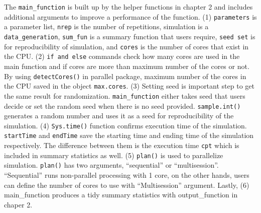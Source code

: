 \documentclass[11pt,a4paper]{article}
\begin{document}
The \texttt{main\_function} is built up by the helper functions in
chapter 2 and includes additional arguments to improve a performance of
the function. (1) \texttt{parameters} is a parameter list, \texttt{nrep}
is the number of repetitions, simulation is a \texttt{data\_generation},
\texttt{sum\_fun} is a summary function that users require,
\texttt{seed\ set} is for reproducibility of simulation, and
\texttt{cores} is the number of cores that exist in the CPU. (2)
\texttt{if\ and\ else} commands check how many cores are used in the
main function and if cores are more than maximum number of the cores or
not. By using \texttt{detectCores()} in parallel package, maximum number
of the cores in the CPU saved in the object \texttt{max.cores}. (3)
Setting seed is important step to get the same result for randomization.
\texttt{main\_function} either takes seed that users decide or set the
random seed when there is no seed provided. \texttt{sample.int()}
generates a random number and uses it as a seed for reproducibility of
the simulation. (4) \texttt{Sys.time()} function confirms execution time
of the simulation. \texttt{startTime} and \texttt{endTime} save the
starting time and ending time of the simulation respectively. The
difference between them is the execution time \texttt{cpt} which is
included in summary statistics as well. (5) \texttt{plan()} is used to
parallelize simulation. \texttt{plan()} has two arguments,
``sequential'' or ``multisession''. ``Sequential'' runs non-parallel
processing with 1 core, on the other hands, users can define the number
of cores to use with ``Multisession'' argument. Lastly, (6)
main\_function produces a tidy summary statistics with output\_function
in chaper 2.
\end{document}
